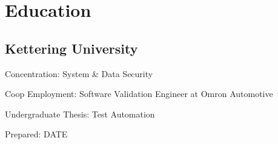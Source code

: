\documentclass[]{formatting}
\begin{document}
\begin{minipage}[t]{0.66\textwidth}

\section{Education}

\subsection{Kettering University}
\begin{tightemize}
\item Concentration: System \& Data Security
\item Coop Employment: Software Validation Engineer at Omron Automotive
\item Undergraduate Thesis: Test Automation
\end{tightemize}
\sectionsep

\end{minipage}

\small{}
Prepared: {DATE}
\end{document}
